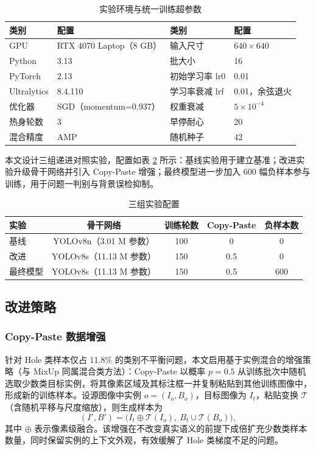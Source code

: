 \begin{table}[H]
\centering
{}
\caption{实验环境与统一训练超参数}\label{tab:setup}
\begin{tabular}{llll}
  \toprule
  类别 & 配置 & 类别 & 配置 \\
  \midrule
  GPU & RTX 4070 Laptop（8 GB） & 输入尺寸 & $640\times640$ \\
  Python & 3.13 & 批大小 & 16 \\
  PyTorch & 2.13 & 初始学习率 lr0 & 0.01 \\
  Ultralytics & 8.4.110 & 学习率衰减 lrf & 0.01，余弦退火 \\
  优化器 & SGD（momentum=0.937） & 权重衰减 & $5\times10^{-4}$ \\
  热身轮数 & 3 & 早停耐心 & 20 \\
  混合精度 & AMP & 随机种子 & 42 \\
  \bottomrule
\end{tabular}
\end{table}

本文设计三组递进对照实验，配置如表 \ref{tab:exps} 所示：基线实验用于建立基准；改进实验升级骨干网络并引入 Copy-Paste 增强；最终模型进一步加入 600 幅负样本参与训练，用于问题一判别与背景误检抑制。

\begin{table}[H]
\centering
{}
\caption{三组实验配置}\label{tab:exps}
\begin{tabular}{lcccc}
  \toprule
  实验 & 骨干网络 & 训练轮数 & Copy-Paste & 负样本数 \\
  \midrule
  基线 & YOLOv8n（3.01 M 参数） & 100 & 0 & 0 \\
  改进 & YOLOv8s（11.13 M 参数） & 150 & 0.5 & 0 \\
  最终模型 & YOLOv8s（11.13 M 参数） & 150 & 0.5 & 600 \\
  \bottomrule
\end{tabular}
\end{table}

\subsection{改进策略}

\subsubsection{Copy-Paste 数据增强}

针对 Hole 类样本仅占 11.8\% 的类别不平衡问题，本文启用基于实例混合的增强策略（与 MixUp\cite{zhang2018mixup} 同属混合类方法）：Copy-Paste\cite{ghiasi2021} 以概率 $p=0.5$ 从训练批次中随机选取少数类目标实例，将其像素区域及其标注框一并复制粘贴到其他训练图像中，形成新的训练样本。设源图像中实例 $o=(I_o,B_o)$，目标图像为 $I_t$，粘贴变换 $\mathcal{T}$（含随机平移与尺度缩放），则生成样本为
\begin{equation}
  (I', B') = \bigl(I_t \oplus \mathcal{T}(I_o),\ B_t \cup \mathcal{T}(B_o)\bigr),
  \label{eq:copypaste}
\end{equation}
其中 $\oplus$ 表示像素级融合。该增强在不改变真实语义的前提下成倍扩充少数类样本数量，同时保留实例的上下文外观，有效缓解了 Hole 类梯度不足的问题。

